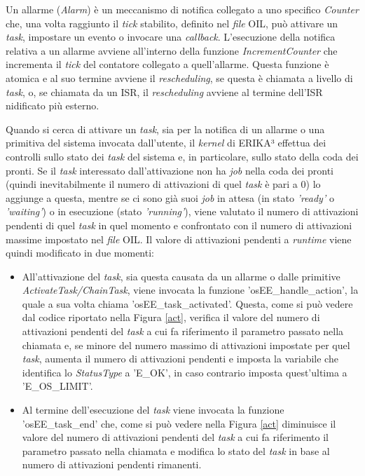 \documentclass{article}
\begin{document}
Un allarme (\textit{Alarm}) è un meccanismo di notifica collegato a uno specifico \textit{Counter} che, una volta raggiunto il \textit{tick} stabilito, definito nel \textit{file} OIL, può attivare un \textit{task}, impostare un evento o invocare una \textit{callback}. L'esecuzione della notifica relativa a un allarme avviene all'interno della funzione \textit{IncrementCounter} che incrementa il \textit{tick} del contatore collegato a quell'allarme. Questa funzione è atomica e al suo termine avviene il \textit{rescheduling}, se questa è chiamata a livello di \textit{task}, o, se chiamata da un ISR, il \textit{rescheduling} avviene al termine dell'ISR nidificato più esterno.

Quando si cerca di attivare un \textit{task}, sia per la notifica di un allarme o una primitiva del sistema invocata dall'utente, il \textit{kernel} di ERIKA³ effettua dei controlli sullo stato dei \textit{task} del sistema e, in particolare, sullo stato della coda dei pronti. Se il \textit{task} interessato dall'attivazione non ha \textit{job} nella coda dei pronti (quindi inevitabilmente il numero di attivazioni di quel \textit{task} è pari a 0) lo aggiunge a questa, mentre se ci sono già suoi \textit{job} in attesa (in stato \textit{'ready'} o \textit{'waiting'}) o in esecuzione (stato \textit{'running'}), viene valutato il numero di attivazioni pendenti di quel \textit{task} in quel momento e confrontato con il numero di attivazioni massime impostato nel \textit{file} OIL. Il valore di attivazioni pendenti a \textit{runtime} viene quindi modificato in due momenti:

\begin{itemize}
\item All'attivazione del \textit{task}, sia questa causata da un allarme o dalle primitive \textit{ActivateTask/ChainTask}, viene invocata la funzione 'osEE\_handle\_action', la quale a sua volta chiama 'osEE\_task\_activated'. Questa, come si può vedere dal codice riportato nella Figura \ref{act}, verifica il valore del numero di attivazioni pendenti del \textit{task} a cui fa riferimento il parametro passato nella chiamata e, se minore del numero massimo di attivazioni impostate per quel \textit{task}, aumenta il numero di attivazioni pendenti e imposta la variabile che identifica lo \textit{StatusType} a 'E\_OK', in caso contrario imposta quest'ultima a 'E\_OS\_LIMIT'.
\item Al termine dell'esecuzione del \textit{task} viene invocata la funzione 'osEE\_task\_end' che, come si può vedere nella Figura \ref{act} diminuisce il valore del numero di attivazioni pendenti del \textit{task} a cui fa riferimento il parametro passato nella chiamata e modifica lo stato del \textit{task} in base al numero di attivazioni pendenti rimanenti.
\end{itemize}
\end{document}

